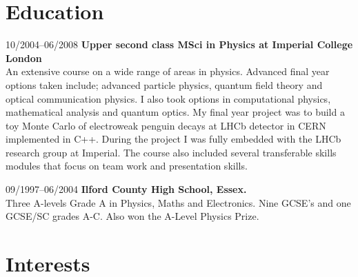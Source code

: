 \documentclass[a4paper]{article}
\begin{document}
\section{Education}

\begin{CV}





\item[10/2004--06/2008] \textbf{Upper second class MSci in Physics at Imperial College London}\\
An extensive course on a wide range of areas in physics. Advanced final year options taken include; advanced particle physics, quantum field theory and optical communication physics. I also took options in computational physics, mathematical analysis and quantum optics.
My final year project was to build a toy Monte Carlo of electroweak penguin decays at LHCb detector in CERN implemented in C++. During the project I was fully embedded with the LHCb research group at Imperial.
The course also included several transferable skills modules that focus on team work and presentation skills.

\item[09/1997--06/2004] \textbf{Ilford County High School, Essex.}\\
Three A-levels Grade A in Physics, Maths and Electronics. Nine GCSE's and
one GCSE/SC grades A-C.
Also won the A-Level Physics Prize.


\end{CV}
\section{Interests} %
\label{sec:interests}
\end{document}
